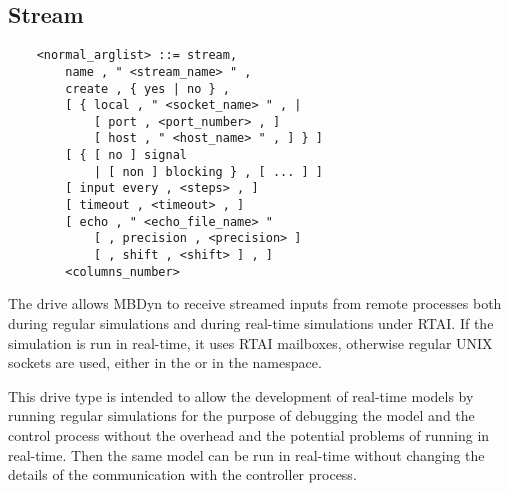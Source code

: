 \subsection{Stream}\label{sec:Stream}
\begin{verbatim}
    <normal_arglist> ::= stream,
        name , " <stream_name> " ,
        create , { yes | no } ,
        [ { local , " <socket_name> " , |
            [ port , <port_number> , ]
            [ host , " <host_name> " , ] } ]
        [ { [ no ] signal
            | [ non ] blocking } , [ ... ] ]
        [ input every , <steps> , ]
        [ timeout , <timeout> , ]
        [ echo , " <echo_file_name> "
            [ , precision , <precision> ]
            [ , shift , <shift> ] , ]
        <columns_number>
\end{verbatim}
The  drive allows MBDyn to receive streamed inputs 
from remote processes both during regular simulations and during 
real-time simulations under RTAI.
If the simulation is run in real-time, it uses RTAI mailboxes, 
otherwise regular UNIX sockets are used, either in the  or 
in the  namespace.

This drive type is intended to allow the development of real-time models
by running regular simulations for the purpose of debugging the model
and the control process without the overhead and the potential problems
of running in real-time.
Then the same model can be run in real-time without changing the details
of the communication with the controller process.

